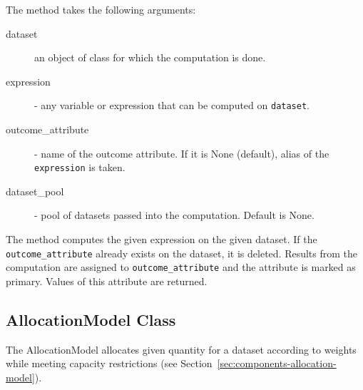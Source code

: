The  method takes the following arguments:
\begin{description}
\item[dataset] an object of class  for which the computation is done.
\item[expression] - any variable or expression that can be computed on \verb|dataset|.
\item[outcome_attribute] - name of the outcome attribute. If it is None (default), alias
of the \verb|expression| is taken.
\item[dataset_pool] - pool of datasets passed into the computation. Default is None.
\end{description}

The  method computes the given expression on the given dataset. If the \verb|outcome_attribute| already exists
on the dataset, it is deleted. Results from the computation are assigned to \verb|outcome_attribute| and 
the attribute is marked as primary. Values of this attribute are returned.

\subsection{AllocationModel Class}
\label{sec:api-allocation-model}
%
The AllocationModel allocates given quantity for a dataset according to weights while meeting capacity restrictions 
(see Section~\ref{sec:components-allocation-model}). 

